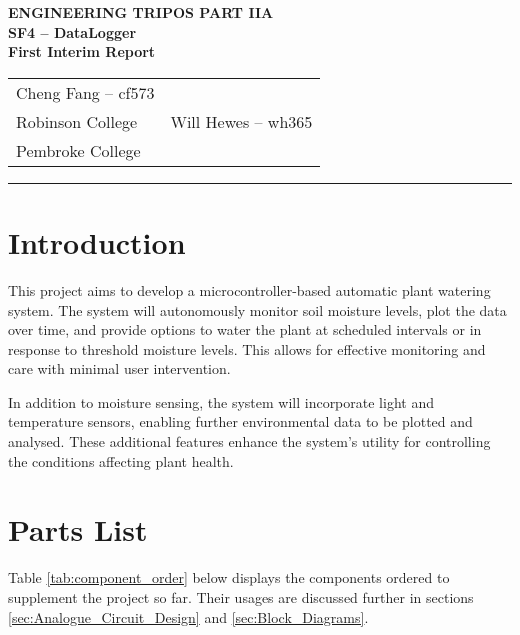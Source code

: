 \documentclass[a4paper,11pt]{article}
\renewcommand{\arraystretch}{1.2}
\renewcommand{\maketitle}{
    \begin{center}
        \LARGE \textbf{ENGINEERING TRIPOS PART IIA} \\[0.5em]
        \Large \textbf{SF4 – DataLogger} \\[0.5em]
        \textbf{First Interim Report} \\[1.5em]
        \begin{tabularx}{0.7\textwidth}{X X}
            \centering \large Cheng Fang -- cf573 \\ \large Robinson College &
            \centering \large Will Hewes -- wh365 \\ \large Pembroke College
        \end{tabularx}
        \vspace{1em}
    \end{center}
}
\begin{document}
\maketitle
\hrule
\tableofcontents
\newpage

\section{Introduction}
\label{sec:Introduction}

This project aims to develop a microcontroller-based 
automatic plant watering system.
The system will autonomously monitor soil moisture levels, 
plot the data over time, and provide options to water the plant
at scheduled intervals or in response to threshold moisture levels.
This allows for effective monitoring and care with minimal user intervention.

In addition to moisture sensing, the system will 
incorporate light and temperature sensors, 
enabling further environmental data to be plotted and analysed.
These additional features enhance the system's utility
for controlling the conditions affecting plant health.

\section{Parts List}
\label{sec:Parts_List}

Table \ref{tab:component_order} below displays the components 
ordered to supplement the project so far.
Their usages are discussed further in sections 
\ref{sec:Analogue_Circuit_Design} and \ref{sec:Block_Diagrams}.

\begin{table}[H]
    \centering
    \renewcommand{\arraystretch}{1.5}
    \caption{Component Order Summary}
    \label{tab:component_order}
\end{table}
\end{document}

